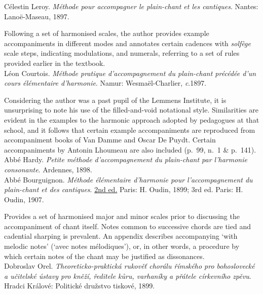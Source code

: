    \parindent=0pt
    \hangindent=0pt
  Célestin Leroy. \emph{Méthode pour accompagner le plain-chant et les cantiques}. Nantes:  Lanoë-Maseau, 1897.

     \parindent=20pt
     \hangindent=20pt
     Following a set of harmonised scales, the author provides example accompaniments in different modes and annotates certain cadences with \emph{solfège} scale steps, indicating modulations, and numerals, referring to a set of rules provided earlier in the textbook.\\

    \parindent=0pt
    \hangindent=0pt
  Léon Courtois. \emph{Méthode pratique d'accompagnement du plain-chant précédée d'un cours élémentaire d'harmonie}. Namur:  Wesmaël-Charlier, \emph{c}.1897.

     \parindent=20pt
     \hangindent=20pt
     Considering the author was a past pupil of the Lemmens Institute, it is unsurprising to note his use of the filled-and-void notational style. Similarities are evident in the examples to the harmonic approach adopted by pedagogues at that school, and it follows that certain example accompaniments are reproduced from accompaniment books of Van Damme and Oscar De Puydt. Certain accompaniments by Antonin Lhoumeau are also included (p.~99, n.~1 \& p.~141).\\

    \parindent=0pt
    \hangindent=0pt
  \covid{}Abbé Hardy. \emph{Petite méthode d'accompagnement du plain-chant par l'harmonie consonante}. Ardennes, 1898. \\

    \parindent=0pt
    \hangindent=0pt
  Abbé Bourguignon. \emph{Méthode élémentaire d'harmonie pour l'accompagnement du plain-chant et des cantiques}. \underline{2nd ed.} Paris:  H. Oudin, 1899;  3rd ed. Paris:  H. Oudin, 1907.

     \parindent=20pt
     \hangindent=20pt
     Provides a set of harmonised major and minor scales prior to discussing the accompaniment of chant itself. Notes common to successive chords are tied and cadential sharping is prevalent. An appendix describes accompanying `with melodic notes' (`avec notes mélodiques'), or, in other words, a procedure by which certain notes of the chant may be justified as dissonances.\\

    \parindent=0pt
    \hangindent=0pt
  Dobroslav Orel. \emph{Theoreticko-praktická rukověť chorálu římského pro bohoslovecké a učitelské ústavy pro kněží, ředitele kůru, varhaníky a přátele církevního zpěvu}. Hradci Králové:  Politické družstvo tiskové, 1899.

